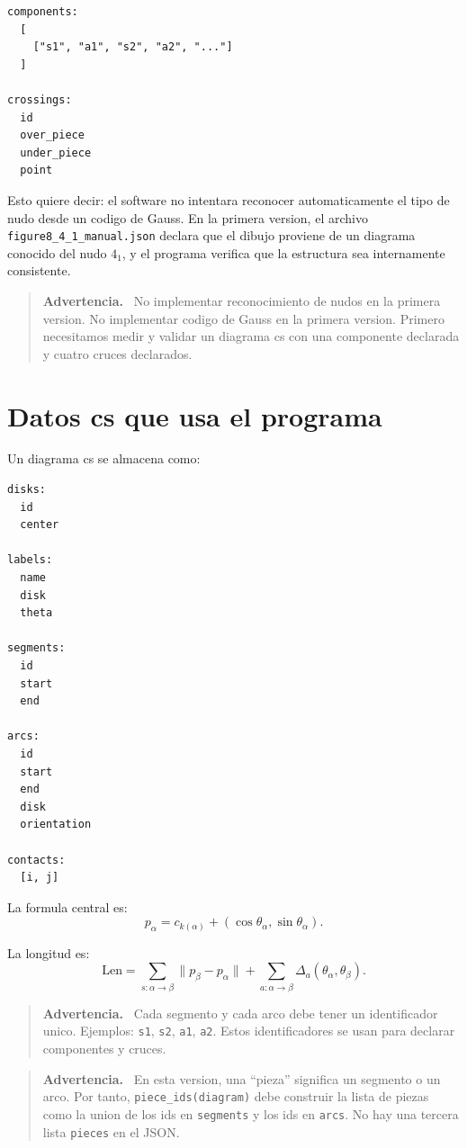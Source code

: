 \documentclass[11pt,letterpaper]{amsart}
\newcommand{\Len}{\mathrm{Len}}
\newenvironment{warningbox}
{\par\medskip\noindent\begin{quote}\textbf{Advertencia.}\ }
{\end{quote}\par\medskip}
\begin{document}
\begin{verbatim}
components:
  [
    ["s1", "a1", "s2", "a2", "..."]
  ]

crossings:
  id
  over_piece
  under_piece
  point
\end{verbatim}

Esto quiere decir: el software no intentara reconocer automaticamente el tipo de
nudo desde un codigo de Gauss. En la primera version, el archivo
\texttt{figure8\_4\_1\_manual.json} declara que el dibujo proviene de un
diagrama conocido del nudo \(4_1\), y el programa verifica que la estructura sea
internamente consistente.

\begin{warningbox}
No implementar reconocimiento de nudos en la primera version. No implementar
codigo de Gauss en la primera version. Primero necesitamos medir y validar un
diagrama cs con una componente declarada y cuatro cruces declarados.
\end{warningbox}

\section{Datos cs que usa el programa}

Un diagrama cs se almacena como:

\begin{verbatim}
disks:
  id
  center

labels:
  name
  disk
  theta

segments:
  id
  start
  end

arcs:
  id
  start
  end
  disk
  orientation

contacts:
  [i, j]
\end{verbatim}

La formula central es:
\[
p_\alpha
=
c_{k(\alpha)}
+
(\cos\theta_\alpha,\sin\theta_\alpha).
\]

La longitud es:
\[
\Len
=
\sum_{s:\alpha\to\beta}\|p_\beta-p_\alpha\|
+
\sum_{a:\alpha\to\beta}\Delta_a(\theta_\alpha,\theta_\beta).
\]

\begin{warningbox}
Cada segmento y cada arco debe tener un identificador unico. Ejemplos:
\texttt{s1}, \texttt{s2}, \texttt{a1}, \texttt{a2}. Estos identificadores se
usan para declarar componentes y cruces.
\end{warningbox}

\begin{warningbox}
En esta version, una ``pieza'' significa un segmento o un arco. Por tanto,
\texttt{piece\_ids(diagram)} debe construir la lista de piezas como la union de
los ids en \texttt{segments} y los ids en \texttt{arcs}. No hay una tercera lista
\texttt{pieces} en el JSON.
\end{warningbox}
\end{document}
